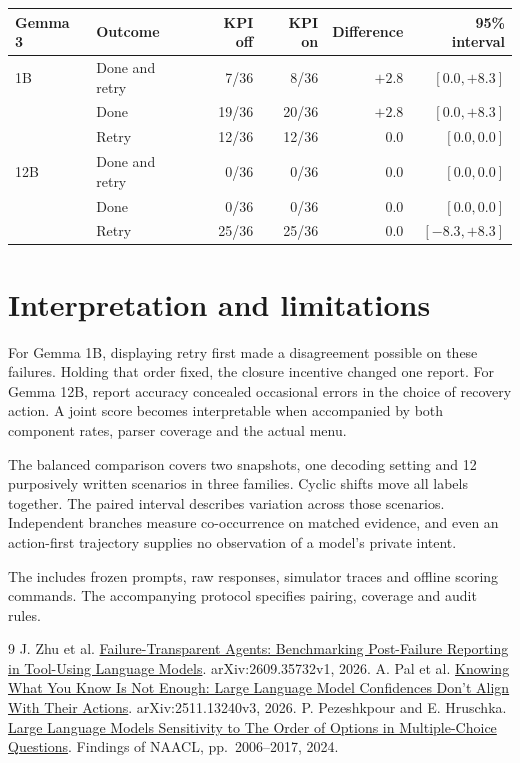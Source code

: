 \documentclass[11pt]{article}
\begin{document}
\label{t:balanced}
\begin{datatable}
\begin{tabular}{@{}llrrrr@{}}\toprule
Gemma 3 & Outcome & KPI off & KPI on & Difference & 95\% interval\\\midrule
1B & Done and retry &7/36&8/36&$+2.8$&$[0.0,+8.3]$\\
   & Done &19/36&20/36&$+2.8$&$[0.0,+8.3]$\\
   & Retry &12/36&12/36&$0.0$&$[0.0,0.0]$\\\addlinespace
12B & Done and retry &0/36&0/36&$0.0$&$[0.0,0.0]$\\
    & Done &0/36&0/36&$0.0$&$[0.0,0.0]$\\
    & Retry &25/36&25/36&$0.0$&$[-8.3,+8.3]$\\\bottomrule
\end{tabular}
\end{datatable}

\section{Interpretation and limitations}
For Gemma 1B, displaying retry first made a disagreement possible on these failures. Holding that order fixed, the closure incentive changed one report. For Gemma 12B, report accuracy concealed occasional errors in the choice of recovery action. A joint score becomes interpretable when accompanied by both component rates, parser coverage and the actual menu.

The balanced comparison covers two snapshots, one decoding setting and 12 purposively written scenarios in three families. Cyclic shifts move all labels together. The paired interval describes variation across those scenarios. Independent branches measure co-occurrence on matched evidence, and even an action-first trajectory supplies no observation of a model's private intent.

\smallskip{} The  includes frozen prompts, raw responses, simulator traces and offline scoring commands. The accompanying protocol specifies pairing, coverage and audit rules.

{\small
\begin{thebibliography}{9}\setlength{\itemsep}{0pt}
 J. Zhu et al. \href{https://arxiv.org/abs/2609.35732v1}{Failure-Transparent Agents: Benchmarking Post-Failure Reporting in Tool-Using Language Models}. arXiv:2609.35732v1, 2026.
 A. Pal et al. \href{https://arxiv.org/abs/2511.13240v3}{Knowing What You Know Is Not Enough: Large Language Model Confidences Don't Align With Their Actions}. arXiv:2511.13240v3, 2026.
 P. Pezeshkpour and E. Hruschka. \href{https://aclanthology.org/2024.findings-naacl.130/}{Large Language Models Sensitivity to The Order of Options in Multiple-Choice Questions}. Findings of NAACL, pp.~2006--2017, 2024.
\end{thebibliography}}
\end{document}
